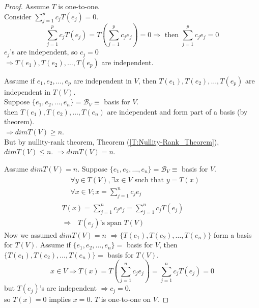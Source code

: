 \documentclass[twoside]{amsart}
\theoremstyle{plain}
\theoremstyle{definition}
\begin{document}
  \begin{proof}
    Assume $T$ is one-to-one.  \\
    \phantom{Ass} Consider $\sum_{j=1}^p c_j T(e_j) = 0$.  
    \[
    \sum_{j=1}^p c_j T(e_j) = T \left( \sum_{j=1}^p c_j e_j \right) = 0 \Longrightarrow \text{ then } \sum_{j=1}^p c_j e_j = 0 
    \]
    \phantom{Ass} $e_j$'s are independent, so $c_j =0$\\
    \phantom{Assume} $\Longrightarrow T(e_1), T(e_2), \dots , T(e_p)$ are independent.  
 
    Assume if $e_1,e_2, \dots, e_p$ are independent in $V$, then $T(e_1),T(e_2), \dots ,T(e_p)$ are independent in $T(V)$. \\
    \phantom{Ass} Suppose $\{e_1, e_2, \dots, e_n \} = \mathcal{B}_V \equiv $ basis for $V$.  \\
    \phantom{Ass Sup} then $T(e_1), T(e_2), \dots , T(e_n)$ are independent and form part of a basis (by theorem).  \\
    \phantom{Ass Sup then} $\Longrightarrow dim T(V) \geq n$.  \\
    \phantom{Ass Sup} But by nullity-rank theorem, Theorem (\ref{T:Nullity-Rank_Theorem}), $dim T(V) \leq n$.  
    \phantom{Ass Sup then} $\Longrightarrow dim T(V) = n$.
  
    Assume $dim T(V) = n$.  
    \phantom{Ass} Suppose $\{e_1, e_2, \dots, e_n \} = \mathcal{B}_V \equiv $ basis for $V$.  \\
    \begin{gather*}
      \begin{aligned}
	& \forall y \in T(V), \exists x \in V \text{ such that } y = T(x) \\
	& \forall x \in V; x = \sum_{j=1}^n c_j e_j 
      \end{aligned} \\
      T(x) = \sum_{j=1}^n c_j e_j = \sum_{j=1}^n c_j T(e_j)  \\
      \Longrightarrow \text{ $T(e_j)$'s span } T(V)
    \end{gather*}
    \phantom{Ass} Now we assumed $dim T(V) = n$
    \phantom{Ass Now} $\Longrightarrow \{ T(e_1), T(e_2), \dots , T(e_n) \} $ form a basis for $T(V)$.  
    Assume if $\{ e_1, e_2, \dots, e_n \} =$ basis for $V$, then  $\{ T(e_1), T(e_2), \dots, T(e_n) \} =$ basis for $T(V)$. \\
    \[
    x \in V \Longrightarrow T(x) = T\left( \sum_{j=1}^n c_j e_j \right) = \sum_{j=1}^n c_j T(e_j) = 0 
    \]
    \phantom{Ass} but $T(e_j)$'s are independent $\Longrightarrow c_j = 0$.\\  
    \phantom{Ass but} so $T(x)= 0$ implies $x=0$.  $T$ is one-to-one on $V$.  
  \end{proof}
\end{document}
